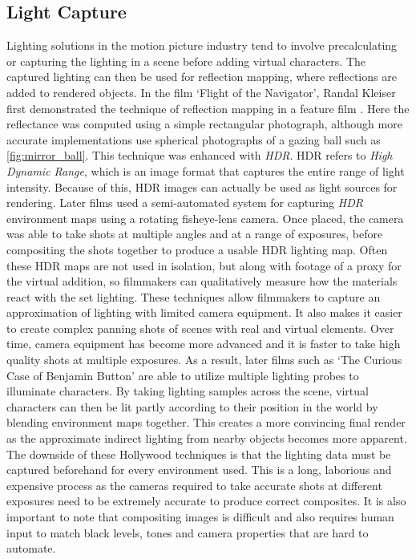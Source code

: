 \documentclass[ %
                    author={Gavin Parker},
                supervisor={Dr. Neill Campbell},
                    degree={MEng},
                     title={Deep Learning for Illumination Estimation from Stereo Images},
                  subtitle={},
                      type={Research},
                      year={2018} ]{dissertation}
\begin{document}
\subsection{Light Capture}
Lighting solutions in the motion picture industry tend to involve precalculating or capturing the lighting in a scene before adding virtual characters. The captured lighting can then be used for reflection mapping, where reflections are added to rendered objects. In the film `Flight of the Navigator', Randal Kleiser first demonstrated the technique of reflection mapping in a feature film \cite{navigator}. Here the reflectance was computed using a simple rectangular photograph, although more accurate implementations use spherical photographs of a gazing ball such as \ref{fig:mirror_ball}. This technique was enhanced with \textit{HDR}. HDR refers to \textit{High Dynamic Range}, which is an image format that captures the entire range of light intensity. Because of this, HDR images can actually be used as light sources for rendering. Later films used a semi-automated system for capturing \textit{HDR} environment maps using a rotating fisheye-lens camera. Once placed, the camera was able to take shots at multiple angles and at a range of exposures, before compositing the shots together to produce a usable HDR lighting map. Often these HDR maps are not used in isolation, but along with footage of a proxy for the virtual addition, so filmmakers can qualitatively measure how the materials react with the set lighting. These techniques allow filmmakers to capture an approximation of lighting with limited camera equipment. It also makes it easier to create complex panning shots of scenes with real and virtual elements. Over time, camera equipment has become more advanced and it is faster to take high quality shots at multiple exposures. As a result, later films such as `The Curious Case of Benjamin Button' are able to utilize multiple lighting probes to illuminate characters. By taking lighting samples across the scene, virtual characters can then be lit partly according to their position in the world by blending environment maps together. This creates a more convincing final render as the approximate indirect lighting from nearby objects becomes more apparent. The downside of these Hollywood techniques is that the lighting data must be captured beforehand for every environment used. This is a long, laborious and expensive process as the cameras required to take accurate shots at different exposures need to be extremely accurate to produce correct composites. It is also important to note that compositing images is difficult and also requires human input to match black levels, tones and camera properties that are hard to automate.
\end{document}
